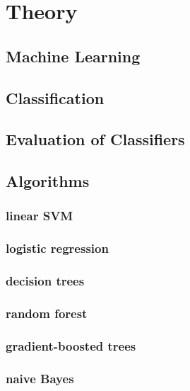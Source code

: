 \chapter{Theory}
\section{Machine Learning}
\section{Classification}
\section{Evaluation of Classifiers}
\section{Algorithms}
\subsection{linear SVM}
\subsection{logistic regression}
\subsection{decision trees}
\subsection{random forest}
\subsection{gradient-boosted trees}
\subsection{naive Bayes}